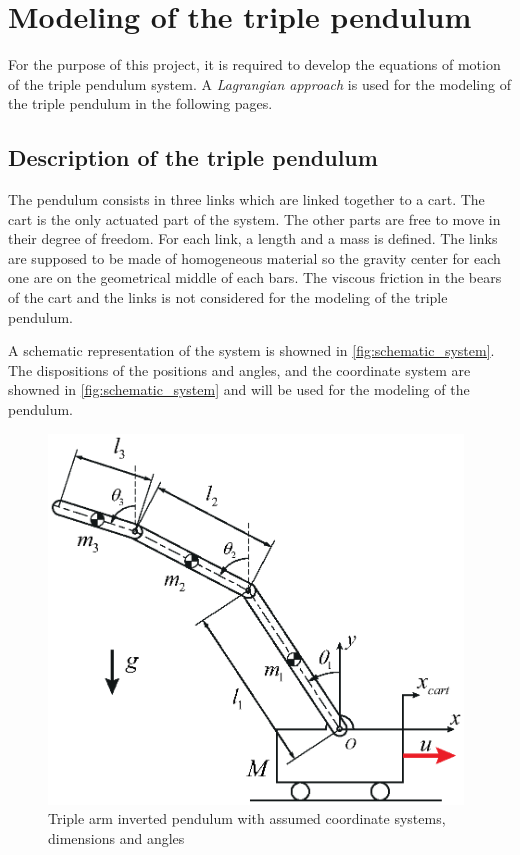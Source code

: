 \documentclass[a4paper,12pt,twoside]{article}
\begin{document}
\section{Modeling of the triple pendulum}
For the purpose of this project, it is required to develop the equations of motion of the triple pendulum system. A \emph{Lagrangian approach} is used for the modeling of the triple pendulum in the following pages.

\subsection{Description of the triple pendulum}
The pendulum consists in three links which are linked together to a cart. The cart is the only actuated part of the system. The other parts are free to move in their degree of freedom. For each link, a length and a mass is defined. The links are supposed to be made of homogeneous material so the gravity center for each one are on the geometrical middle of each bars. The viscous friction in the bears of the cart and the links is not considered for the modeling of the triple pendulum.

A schematic representation of the system is showned in \autoref{fig:schematic_system}. The dispositions of the positions and angles, and the coordinate system are showned in \autoref{fig:schematic_system} and will be used for the modeling of the pendulum.
\begin{figure}[ht]
	\centering
	\includegraphics[width=11cm]{illustrations/schematic_system.eps}
	\caption{Triple arm inverted pendulum with assumed coordinate systems, dimensions and angles}
	\label{fig:schematic_system}
\end{figure}
\end{document}
